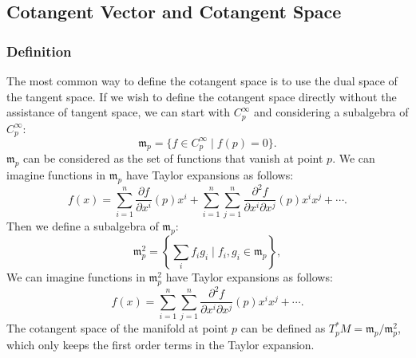 \documentclass{report}
\begin{document}
\subsection{Cotangent Vector and Cotangent Space}
\subsubsection{Definition}
The most common way to define the cotangent space is to use the dual space of the tangent space.
If we wish to define the cotangent space directly without the assistance of tangent space, we can start with $C^\infty_p$ and considering a subalgebra of $C^\infty_p$:
\[
    \mathfrak{m}_p=\{f\in C^\infty_p\mid f(p)=0\}.
\]
$\mathfrak{m}_p$ can be considered as the set of functions that vanish at point $p$. We can imagine functions in $\mathfrak{m}_p$ have Taylor expansions as follows:
\[
    f(x)=\sum_{i=1}^n\frac{\partial f}{\partial x^i}(p)x^i+\sum_{i=1}^n\sum_{j=1}^n\frac{\partial^2 f}{\partial x^i\partial x^j}(p)x^ix^j+\cdots.
\] 
Then we define a subalgebra of $\mathfrak{m}_p$:
\[
    \mathfrak{m}^2_p=\left\{\sum_if_ig_i\mid f_i, g_i\in \mathfrak{m}_p\right\},
\]
We can imagine functions in $\mathfrak{m}_p^2$ have Taylor expansions as follows:
\[
    f(x)=\sum_{i=1}^n\sum_{j=1}^n\frac{\partial^2 f}{\partial x^i\partial x^j}(p)x^ix^j+\cdots.
\] 
The cotangent space of the manifold at point $p$ can be defined as $T_p^*M=\mathfrak{m}_p/\mathfrak{m}^2_p$, which only keeps the first order terms in the Taylor expansion.


\end{document}
